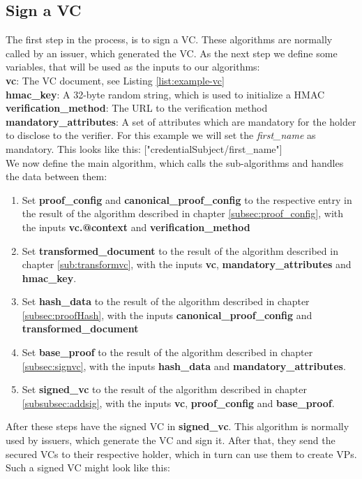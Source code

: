 \documentclass[
	a4paper               %
	,BCOR=0mm            %
	,bibliography=totoc   %
	,listof=totoc         %
	,monolingual
	,twoside=false
]{bfhthesis}              %
\begin{document}
\subsection{Sign a VC}
The first step in the process, is to sign a VC.
These algorithms are normally called by an issuer, which generated the VC.
As the next step we define some variables, that will be used as the inputs to our algorithms:\\
\textbf{vc}: The VC document, see Listing \ref{list:example-vc}\\
\textbf{hmac\_key}: A 32-byte random string, which is used to initialize a HMAC\\
\textbf{verification\_method}: The URL to the verification method\\
\textbf{mandatory\_attributes}: A set of attributes which are mandatory for the holder to disclose to the verifier. For this example we will set the \textit{first\_name} as mandatory. This looks like this: ["credentialSubject/first\_name"]\\

We now define the main algorithm, which calls the sub-algorithms and handles the data between them:
\begin{enumerate}
	\item Set \textbf{proof\_config} and \textbf{canonical\_proof\_config} to the respective entry in the result of the algorithm described in chapter \ref{subsec:proof_config}, with the inputs \textbf{vc.@context} and \textbf{verification\_method}
	\item Set \textbf{transformed\_document} to the result of the algorithm described in chapter \ref{sub:transformvc}, with the inputs \textbf{vc}, \textbf{mandatory\_attributes} and \textbf{hmac\_key}.
	\item Set \textbf{hash\_data} to the result of the algorithm described in chapter \ref{subsec:proofHash}, with the inputs \textbf{canonical\_proof\_config} and \textbf{transformed\_document}
	\item Set \textbf{base\_proof} to the result of the algorithm described in chapter \ref{subsec:signvc}, with the inputs \textbf{hash\_data} and \textbf{mandatory\_attributes}.
	\item Set \textbf{signed\_vc} to the result of the algorithm described in chapter \ref{subsubsec:addsig}, with the inputs \textbf{vc}, \textbf{proof\_config} and \textbf{base\_proof}.
\end{enumerate}

After these steps have the signed VC in \textbf{signed\_vc}.
This algorithm is normally used by issuers, which generate the VC and sign it.
After that, they send the secured VCs to their respective holder, which in turn can use them to create VPs.
Such a signed VC might look like this:
\end{document}
